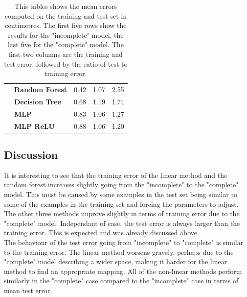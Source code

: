 \begin{table}[]
\begin{tabular}{l|l|l|l|l|}
\textbf{}           & \textbf{Random Forest} & 0.42                                                                 & 1.07                                                             & 2.55                                                                \\ \cline{2-5}
\textbf{}           & \textbf{Decision Tree} & 0.68                                                                 & 1.19                                                             & 1.74                                                                \\ \cline{2-5}
\textbf{}           & \textbf{MLP}           & 0.83                                                                 & 1.06                                                             & 1.27                                                                \\ \cline{2-5}
\textbf{}           & \textbf{MLP ReLU}      & 0.88                                                                 & 1.06                                                             & 1.20                                                                \\ \cline{2-5}
\end{tabular}
\caption[Learnt mapping results]{This tables shows the mean errors computed on the training and test set in centimetres. The first five rows show the results for the "incomplete" model, the last five for the "complete" model. The first two columns are the training and test error, followed by the ratio of test to training error.}
\label{tableMapping}
\end{table}

\subsection{Discussion}
It is interesting to see that the training error of the linear method and the random forest increases slightly going from the "incomplete" to the "complete" model. This must be caused by some examples in the test set being similar to some of the examples in the training set and forcing the parameters to adjust. The other three methods improve slightly in terms of training error due to the "complete" model. Independant of case, the test error is always larger than the training error. This is expected and was already discussed above.\\

The behaviour of the test error going from "incomplete" to "complete" is similar to the training error. The linear method worsens gravely, perhaps due to the "complete" model describing a wider space, making it harder for the linear method to find an appropriate mapping. All of the non-linear methods perform similarly in the "complete" case compared to the "incomplete" case in terms of mean test error.\\

